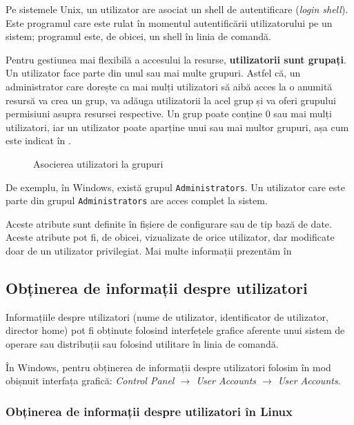 Pe sistemele Unix, un utilizator are asociat un shell de autentificare (\textit{login shell}).
Este programul care este rulat în momentul autentificării utilizatorului pe un sistem;
programul este, de obicei, un shell în linia de comandă.

Pentru gestiunea mai flexibilă a accesului la resurse, \textbf{utilizatorii sunt grupați}.
Un utilizator face parte din unul sau mai multe grupuri.
Astfel că, un administrator care dorește ca mai mulți utilizatori să aibă acces la o anumită resursă va crea un grup, va adăuga utilizatorii la acel grup și va oferi grupului permisiuni asupra resursei respective.
Un grup poate conține 0 sau mai mulți utilizatori, iar un utilizator poate aparține unui sau mai multor grupuri, așa cum este indicat în .

\begin{figure}[htbp]
  \centering
  \def\svgwidth{\columnwidth}
  
  \caption{Asocierea utilizatori la grupuri}
  \label{fig:user:multi-user}
\end{figure}

De exemplu, în Windows, există grupul \texttt{Administrators}.
Un utilizator care este parte din grupul \texttt{Administrators} are acces complet la sistem.

Aceste atribute sunt definite în fișiere de configurare sau de tip bază de date.
Aceste atribute pot fi, de obicei, vizualizate de orice utilizator, dar modificate doar de un utilizator privilegiat.
Mai multe informații prezentăm în 

\subsection{Obținerea de informații despre utilizatori}
\label{sec:user:user:info}

Informațiile despre utilizatori (nume de utilizator, identificator de utilizator, director home) pot fi obținute folosind interfețele grafice aferente unui sistem de operare sau distribuții sau folosind utilitare în linia de comandă.

În Windows, pentru obținerea de informații despre utilizatori folosim în mod obișnuit interfața grafică: \textit{Control Panel $\rightarrow$ User Accounts $\rightarrow$ User Accounts}.

\subsubsection{Obținerea de informații despre utilizatori în Linux}
\label{sec:user:linux-user-info}

